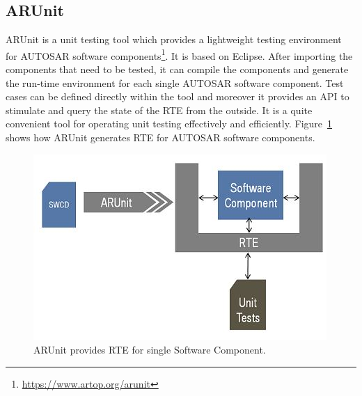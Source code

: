  
\subsection{ARUnit}\label{sec:arunit}

ARUnit is a unit testing tool which provides a lightweight testing environment for AUTOSAR software components\footnote{\url{https://www.artop.org/arunit}}. It is based on Eclipse. After importing the components that need to be tested, it can compile the components and generate the run-time environment for each single AUTOSAR software component. %
Test cases can be defined directly within the tool and moreover it provides an API to stimulate and query the state of the RTE from the outside. 
It is a quite convenient tool for operating unit testing effectively and efficiently. Figure~\ref{fig:ARUnit} shows how ARUnit generates RTE for AUTOSAR software components. %

\begin{figure}[htb]
\centering
\includegraphics[width=0.9\linewidth]{figure/arunitin.jpg}
\caption{ARUnit provides RTE for single Software Component.}
\label{fig:ARUnit}
\end{figure}